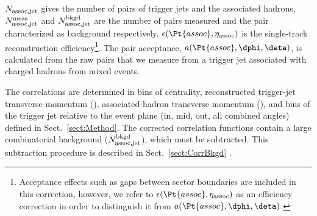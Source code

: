 

$N_{\rm assoc, jet}$ gives the number of pairs of trigger jets and the associated hadrons, $N^{\rm meas}_{\rm assoc,jet}$ and $N^{\rm bkgd}_{\rm assoc,jet}$ are the number of pairs measured and the pair characterized as background respectively. $\epsilon(\Pt{assoc}, \eta_{\rm assoc})$ is the single-track reconstruction efficiency\footnote{Acceptance effects such as gaps between sector boundaries are included in this correction, however, we refer to $\epsilon(\Pt{assoc}, \eta_{\rm assoc})$ as an efficiency correction in order to distinguish it from $a(\Pt{assoc}, \text{\dphi}, \text{\deta})$.}.  The pair acceptance, $a(\Pt{assoc}, \text{\dphi}, \text{\deta})$, is calculated from the raw pairs that we measure from a trigger jet associated with charged hadrons from mixed events.  %

The correlations are determined in bins of centrality, reconstructed trigger-jet transverse momentum (), associated-hadron transverse momentum (), and bins of the trigger jet relative to the event plane (in, mid, out, all combined angles) defined in Sect.~\ref{sect:Method}.  The corrected correlation functions contain a large combinatorial background ($N^{\rm bkgd}_{\rm assoc,jet}$), which must be subtracted.  This subtraction procedure is described in Sect.~\ref{sect:CorrBkgd} .



\label{sect:MixedEvents}

